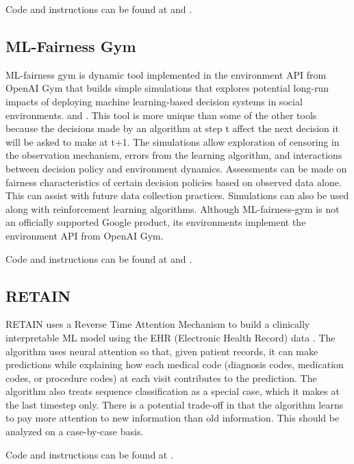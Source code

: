 \documentclass[conference]{IEEEtran}
\begin{document}
Code and instructions can be found at \cite{b50} and \cite{b51}.

\subsection{ML-Fairness Gym}
ML-fairness gym is dynamic tool implemented in the environment API from OpenAI Gym that builds simple simulations that explores potential long-run impacts of deploying machine learning-based decision systems in social environments. \cite{b52} and \cite{b53}.
This tool is more unique than some of the other tools because the decisions made by an algorithm at step t affect the next decision it will be asked to make at t+1. The simulations allow exploration of censoring in the observation mechanism, errors from the learning algorithm, and interactions between decision policy and environment dynamics. Assessments can be made on fairness characteristics of certain decision policies based on observed data alone. This can assist with future data collection practices.
Simulations can also be used along with reinforcement learning algorithms.
Although ML-fairness-gym is not an officially supported Google product, its environments implement the environment API from OpenAI Gym.

Code and instructions can be found at \cite{b54} and \cite{b55}.

\subsection{RETAIN}
RETAIN uses a Reverse Time Attention Mechanism to build a clinically interpretable ML model using the EHR (Electronic Health Record) data \cite{b56}. The algorithm uses neural attention so that, given patient records, it can make predictions while explaining how each medical code (diagnosis codes, medication codes, or procedure codes) at each visit contributes to the prediction. The algorithm also treats sequence classification as a special case, which it makes at the last timestep only.
There is a potential trade-off in that the algorithm learns to pay more attention to new information than old information. This should be analyzed on a case-by-case basis.

Code and instructions can be found at \cite{b57}.
\end{document}
